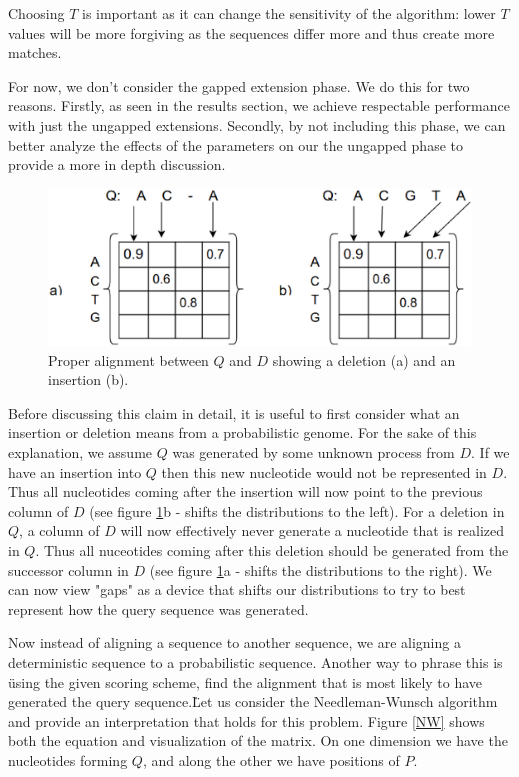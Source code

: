 \documentclass[12pt]{IEEEtran}
\begin{document}
Choosing $T$ is important as it can change the sensitivity of the algorithm: lower $T$ values will be more forgiving as the sequences differ more and thus create more matches.

For now, we don't consider the gapped extension phase. We do this for two reasons. Firstly, as seen in the results section, we achieve respectable performance with just the ungapped extensions. Secondly, by not including this phase, we can better analyze the effects of the parameters on our the ungapped phase to provide a more in depth discussion.

\begin{figure}
    \centering
    \includegraphics[scale=0.5]{indel}
    \caption{Proper alignment between $Q$ and $D$ showing a deletion (a) and an insertion (b).}
    \label{indel}
\end{figure}

Before discussing this claim in detail, it is useful to first consider what an insertion or deletion means from a probabilistic genome. For the sake of this explanation, we assume $Q$ was generated by some unknown process from $D$. If we have an insertion into $Q$ then this new nucleotide would not be represented in $D$. Thus all nucleotides coming after the insertion will now point to the previous column of $D$ (see figure \ref{indel}b - shifts the distributions to the left). For a deletion in $Q$, a column of $D$ will now effectively never generate a nucleotide that is realized in $Q$. Thus all nuceotides coming after this deletion should be generated from the successor column in $D$ (see figure \ref{indel}a - shifts the distributions to the right). We can now view "gaps" as a device that shifts our distributions to try to best represent how the query sequence was generated.

Now instead of aligning a sequence to another sequence, we are aligning a deterministic sequence to a probabilistic sequence. Another way to phrase this is \"using the given scoring scheme, find the alignment that is most likely to have generated the query sequence.\" Let us consider the Needleman-Wunsch algorithm and provide an interpretation that holds for this problem. Figure \ref{NW} shows both the equation and visualization of the matrix. On one dimension we have the nucleotides forming $Q$, and along the other we have positions of $P$. 
\end{document}
